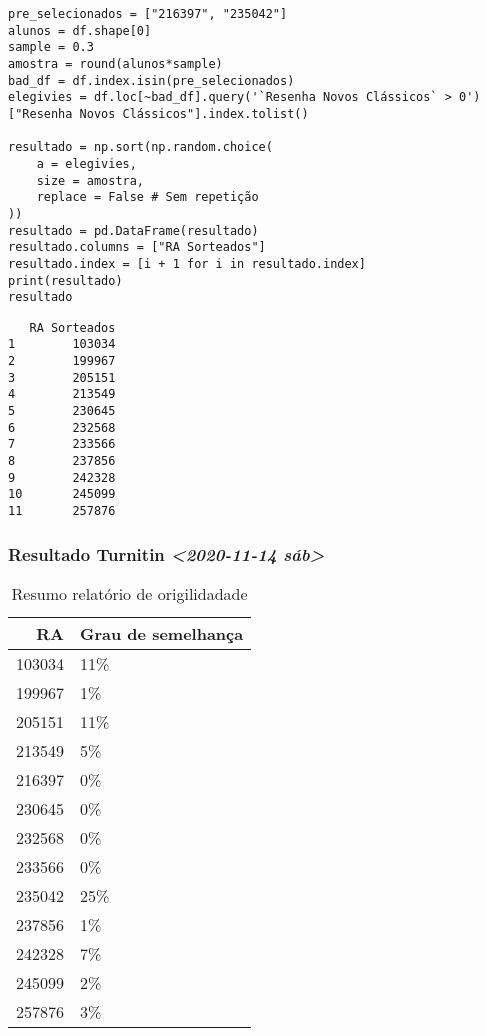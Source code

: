 \documentclass[11pt]{article}
\begin{document}
\begin{verbatim}
pre_selecionados = ["216397", "235042"]
alunos = df.shape[0]
sample = 0.3
amostra = round(alunos*sample)
bad_df = df.index.isin(pre_selecionados)
elegivies = df.loc[~bad_df].query('`Resenha Novos Clássicos` > 0')["Resenha Novos Clássicos"].index.tolist()

resultado = np.sort(np.random.choice(
    a = elegivies,
    size = amostra,
    replace = False # Sem repetição
))
resultado = pd.DataFrame(resultado)
resultado.columns = ["RA Sorteados"]
resultado.index = [i + 1 for i in resultado.index]
print(resultado)
resultado
\end{verbatim}

\begin{verbatim}
   RA Sorteados
1        103034
2        199967
3        205151
4        213549
5        230645
6        232568
7        233566
8        237856
9        242328
10       245099
11       257876
\end{verbatim}





\subsubsection{Resultado Turnitin \textit{<2020-11-14 sáb>}}
\label{sec:org5235fc5}

\begin{table}[htbp]
\caption{\label{TurnitinNvC}Resumo relatório de origilidadade}
\centering
\begin{tabular}{rl}
\hline
RA & Grau de semelhança\\
\hline
103034 & 11\%\\
199967 & 1\%\\
205151 & 11\%\\
213549 & 5\%\\
216397 & 0\%\\
230645 & 0\%\\
232568 & 0\%\\
233566 & 0\%\\
235042 & 25\%\\
237856 & 1\%\\
242328 & 7\%\\
245099 & 2\%\\
257876 & 3\%\\
\hline
\end{tabular}
\end{table}
\end{document}
